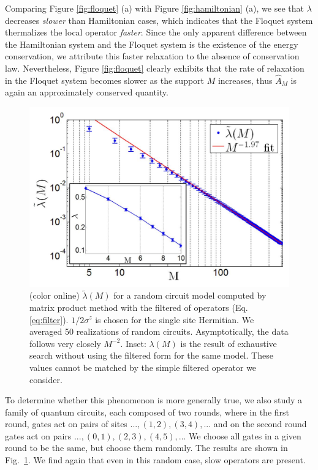 \documentclass[twocolumn,superscriptaddress, prb]{revtex4-1}
\begin{document}
Comparing Figure \ref{fig:floquet} (a) with Figure \ref{fig:hamiltonian} (a),
we see that $\lambda$ decreases {\it slower} than Hamiltonian cases, which indicates that the Floquet system thermalizes
the local operator {\it faster}. Since the only apparent difference between the Hamiltonian system and the Floquet system
is the existence of the energy conservation, we attribute this faster relaxation to the absence of conservation law.
Nevertheless, Figure \ref{fig:floquet} clearly exhibits that the rate of relaxation in the Floquet system
becomes slower as the support $M$ increases, thus $\hat{A}_M$ is again an approximately conserved quantity.


\begin{figure}
\includegraphics[width=1.0\linewidth]{fig_random_circuit.pdf}
\centering
\caption{ (color online)  $\tilde{\lambda}(M)$ for a random circuit model computed by matrix product method with the filtered of operators (Eq. \eqref{eq:filter}). $1/2\sigma^z$ is chosen for the single site Hermitian. We averaged 50 realizations of random circuits. Asymptotically, the data follows very closely $M^{-2}$.
Inset: $\lambda(M)$ is the result of exhaustive search without using the filtered form for the same model.
These values cannot be matched by the simple filtered operator we consider.}
\label{fig:random_circuit}
\end{figure}



To determine whether this phenomenon is more generally true, we also study a family of quantum circuits, each composed of two rounds, where in the first round, gates act on pairs of sites $...,(1,2),(3,4),...$ and on the second round gates act on pairs $...,(0,1),(2,3),(4,5),...$
We choose all gates in a given round to be the same, but choose them randomly.
The results are shown in Fig.~\ref{fig:random_circuit}.
We find again that even in this random case, slow operators are present.
\end{document}
